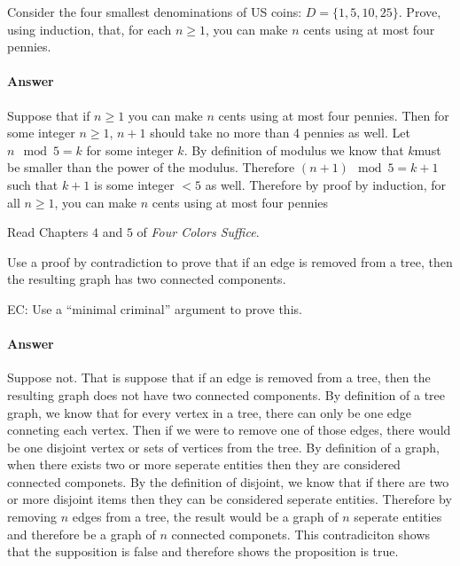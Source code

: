 \documentclass{article}
\begin{document}
Consider the four smallest denominations of US coins: $D=\{1,5,10,25\}$.  Prove, using
induction, that, for each $n \geq 1$, you can make $n$ cents using at most four
pennies.

\paragraph{Answer}

Suppose that if $n \geq 1$ you can make $n$ cents using at most four pennies. Then for some integer $n \geq 1$, $n+1$ should take no more than 4 pennies as well. Let $n \mod 5=k$ for some integer $k$. By definition of modulus we know that $k$must be smaller than the power of the modulus. Therefore $(n+1) \mod 5=k+1$ such that $k+1$ is some integer $ <5$ as well. Therefore by proof by induction, for all $n \geq 1$, you can make $n$ cents using at most four pennies

 

Read Chapters $4$ and $5$ of \emph{Four Colors Suffice}.

Use a proof by contradiction to prove that if an edge is removed from a
tree, then the resulting graph has two connected components.

EC:
Use a ``minimal criminal'' argument to prove this.

        \paragraph{Answer}

        Suppose not. That is suppose that if an edge is removed from a tree, then the resulting graph does not have two connected components. By definition of a tree graph, we know that for every vertex in a tree, there can only be
one edge conneting each vertex. Then if we were to remove one of those edges, there would be one disjoint vertex or sets of vertices from the tree. By definition of a graph, when there exists two or more seperate entities then they are considered connected componets. By the definition of disjoint, we know that if there are two or more disjoint items then they can be considered seperate entities. Therefore by removing $n$ edges from a tree, the result would be a graph of $n$ seperate entities and therefore be a graph of $n$ connected componets. This contradiciton shows that the supposition is false and therefore shows the proposition is true.

% 
% 
\end{document}
